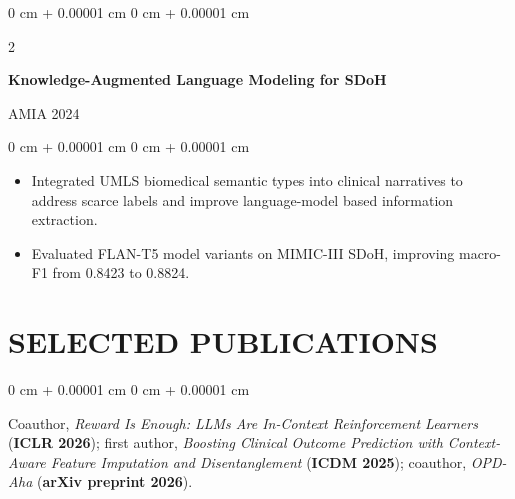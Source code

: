 \documentclass[10pt, letterpaper]{article}
\newenvironment{highlights}{
    \begin{itemize}[
        topsep=0.03 cm,
        parsep=0.03 cm,
        partopsep=0pt,
        itemsep=0pt,
        leftmargin=0 cm + 10pt
    ]
}{
    \end{itemize}
} %
\newenvironment{onecolentry}{
    \begin{adjustwidth}{
        0 cm + 0.00001 cm
    }{
        0 cm + 0.00001 cm
    }
}{
    \end{adjustwidth}
} %
\newenvironment{twocolentry}[2][]{
    \onecolentry
    \def\secondColumn{#2}
    \setcolumnwidth{\fill, 4.5 cm}
    \begin{paracol}{2}
}{
    \switchcolumn \raggedleft \secondColumn
    \end{paracol}
    \endonecolentry
} %
\begin{document}
\begin{twocolentry}{AMIA 2024}
\textbf{Knowledge-Augmented Language Modeling for SDoH}
\end{twocolentry}
\begin{onecolentry}
\begin{highlights}
\item Integrated UMLS biomedical semantic types into clinical narratives to address scarce labels and improve language-model based information extraction.
\item Evaluated FLAN-T5 model variants on MIMIC-III SDoH, improving macro-F1 from 0.8423 to 0.8824.
\end{highlights}
\end{onecolentry}
\vspace{0.035 cm}
\section{SELECTED PUBLICATIONS}
\begin{onecolentry}
Coauthor, \textit{Reward Is Enough: LLMs Are In-Context Reinforcement Learners} (\textbf{ICLR 2026}); first author, \textit{Boosting Clinical Outcome Prediction with Context-Aware Feature Imputation and Disentanglement} (\textbf{ICDM 2025}); coauthor, \textit{OPD-Aha} (\textbf{arXiv preprint 2026}).
\end{onecolentry}
\end{document}
